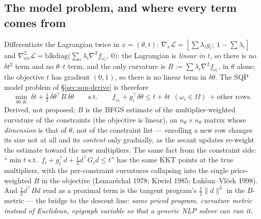 \documentclass[11pt,a4paper]{article}
\newcommand{\T}{^{\!\top}}
\newcommand{\rev}[1]{#1}
\begin{document}
\subsection{The model problem, and where every term comes from}
Differentiate the Lagrangian twice in $x=(\theta,t)$:
$\nabla_x\mathcal L=[\sum\lambda_ig_i;\ 1-\sum\lambda_i]$ and
$\nabla^2_{xx}\mathcal L=\mathrm{blkdiag}\bigl(\sum_i\lambda_i\nabla^2f_{\omega_i},\ 0\bigr)$:
the Lagrangian is \emph{linear in $t$}, so there is no $\delta t^2$ term and no
$\theta$--$t$ term, and the only curvature is $B:=\sum\lambda_i\nabla^2f_{\omega_i}$, in
$\theta$ alone; the objective $t$ has gradient $(0,1)$, so there is no linear term in
$\delta\theta$.  The SQP model problem of \S\ref{sec:sqp-derive} is therefore
\[
\boxed{\;\min_{\delta\theta,\delta t}\ \delta t+\tfrac12\,\delta\theta\T B\,\delta\theta
\qquad\text{s.t.}\qquad f_{\omega_i}+g_i\T\delta\theta\le t+\delta t\ \ (\omega_i\in\Omega)\ +\text{other rows}.\;}
\]
Derived, not proposed; $B$ is the BFGS estimate of the multiplier-weighted curvature of
the constraints (the objective is linear), \rev{an $n_\theta\times n_\theta$ matrix whose \emph{dimension} is that of $\theta$,
not of the constraint list --- enrolling a new row changes its size not at all and its
\emph{content} only gradually, as the secant updates re-weight the estimate toward the
new multipliers.}  The same fact from the constraint
side: ``$\min t$ s.t.\ $f_i+g_i\T d+\tfrac12d\T G_id\le t$'' has the same KKT points at
the true multipliers, with the per-constraint curvatures collapsing into the single
price-weighted $B$ in the objective (Lemar\'echal 1978; Kiwiel 1985; Luk\v san--Vl\v cek
1998).  And $\tfrac12d\T Bd$ read as a proximal term is the tangent program's
$\tfrac12\|d\|^2$ in the $B$-metric --- the bridge to the descent line: \emph{same priced
program, curvature metric instead of Euclidean, epigraph variable so that a generic NLP
solver can run it}.
\end{document}
